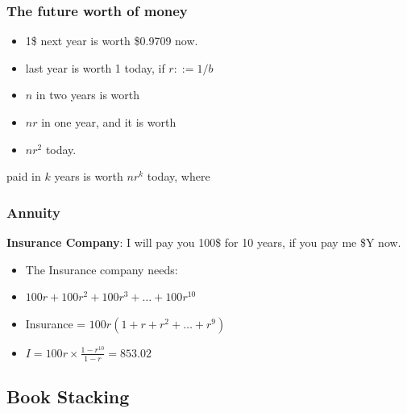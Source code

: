 \documentclass{beamer}
\begin{document}
\begin{frame}
  \frametitle{The future worth of money}
  
  {\larger
    \begin{itemize}
    \item 1\$ next year is worth \$0.9709 now.
      \bigskip

    \item {} last year is worth 1 today, if $r ::= 1/b$
      \bigskip

    \item $n$ in two years is worth
    \item $nr$ in one year, and it is worth
    \item $nr^2$ today.
    \end{itemize}

    \vfill

    \begin{center}
       paid in $k$ years is \alert{worth $nr^k$ today},
      where 
    \end{center}
  }
\end{frame}

\begin{frame}
  \frametitle{Annuity}

  {\larger
    {\bf Insurance Company}: I will pay you 100\$ for 10 years,
    if you pay me \$Y now. 

    \bigskip

    \begin{itemize}
    \item The Insurance company needs:
    \item $100r + 100r^2 + 100r^3 + \ldots + 100r^{10}$
    \item<2-> Insurance = $100r(1+r+r^2+\ldots+r^9)$
    \item<2-> $I = 100r \times \frac{1-r^{10}}{1-r} = 853.02$
    \end{itemize}

  }
\end{frame}

\subsection{Book Stacking}
\end{document}
